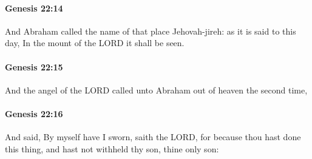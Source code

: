 		\paragraph{Genesis 22:14} %
			\label{GENESIS-22-14}

			And Abraham called the name of that place Jehovah-jireh: as it is said to this day, In the mount of the LORD it shall be seen.


		\paragraph{Genesis 22:15} %
			\label{GENESIS-22-15}

			And the angel of the LORD called unto Abraham out of heaven the second time,


		\paragraph{Genesis 22:16} %
			\label{GENESIS-22-16}

			And said, By myself have I sworn, saith the LORD, for because thou hast done this thing, and hast not withheld thy son, thine only son:


